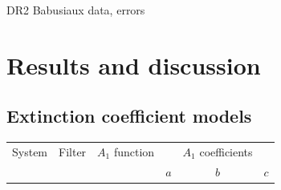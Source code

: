 \documentclass[12pt, a4paper]{report}
\begin{document}
DR2 Babusiaux data, errors

\chapter{Results and discussion}
\section{Extinction coefficient models} \label{coef_models}

\begin{table}
\begin{center}
\begin{tabular}{cccccc}
\hline
System & Filter & $A_{1}$ function & & $A_{1}$ coefficients & \\
 & & & $a$ & $b$ & $c$ \\
\hline


\end{tabular}
\end{center}
\end{table}
\end{document}

